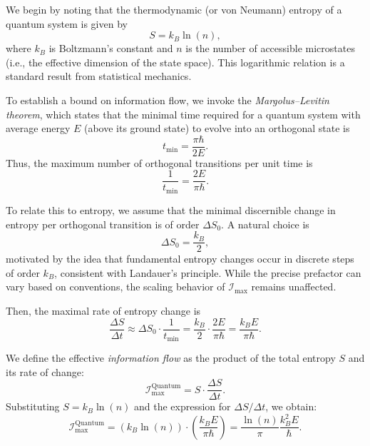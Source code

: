 \documentclass[12pt]{article}
\begin{document}
We begin by noting that the thermodynamic (or von Neumann) entropy of a quantum system is given by
\begin{equation}
    S = k_B \ln(n),
\end{equation}
where \( k_B \) is Boltzmann’s constant and \( n \) is the number of accessible microstates (i.e., the effective dimension of the state space). This logarithmic relation is a standard result from statistical mechanics.

To establish a bound on information flow, we invoke the \textit{Margolus–Levitin theorem}, which states that the minimal time required for a quantum system with average energy \( E \) (above its ground state) to evolve into an orthogonal state is
\begin{equation}
    t_{\min} = \frac{\pi \hbar}{2E}.
\end{equation}
Thus, the maximum number of orthogonal transitions per unit time is
\begin{equation}
    \frac{1}{t_{\min}} = \frac{2E}{\pi \hbar}.
\end{equation}

To relate this to entropy, we assume that the minimal discernible change in entropy per orthogonal transition is of order \( \Delta S_0 \). A natural choice is
\begin{equation}
    \Delta S_0 = \frac{k_B}{2},
\end{equation}
motivated by the idea that fundamental entropy changes occur in discrete steps of order \( k_B \), consistent with Landauer’s principle. While the precise prefactor can vary based on conventions, the scaling behavior of \( \mathcal{I}_{\text{max}} \) remains unaffected.

Then, the maximal rate of entropy change is
\begin{equation}
    \frac{\Delta S}{\Delta t} \approx \Delta S_0 \cdot \frac{1}{t_{\min}}
    = \frac{k_B}{2} \cdot \frac{2E}{\pi \hbar}
    = \frac{k_B E}{\pi \hbar}.
\end{equation}

We define the effective \textit{information flow} as the product of the total entropy \( S \) and its rate of change:
\begin{equation}
    \mathcal{I}_{\text{max}}^{\text{Quantum}} = S \cdot \frac{\Delta S}{\Delta t}.
\end{equation}
Substituting \( S = k_B \ln(n) \) and the expression for \( \Delta S / \Delta t \), we obtain:
\begin{equation}
    \mathcal{I}_{\text{max}}^{\text{Quantum}} 
    = \left(k_B \ln(n)\right) \cdot \left(\frac{k_B E}{\pi \hbar}\right)
    = \frac{\ln(n)}{\pi}\frac{k_B^2 E}{\hbar}.
\end{equation}
\end{document}
